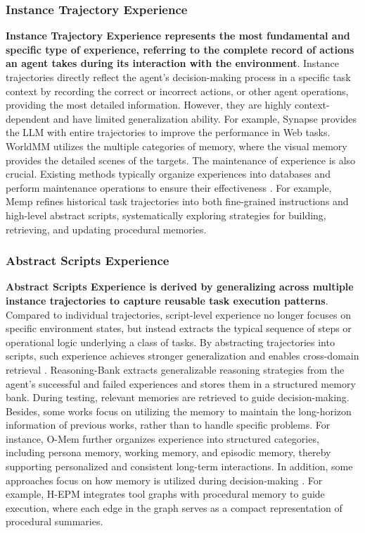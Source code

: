 \subsubsection{Instance Trajectory Experience}
\label{sec:instance_trajectory_experience}
\textbf{Instance Trajectory Experience represents the most fundamental and specific type of experience, referring to the complete record of actions an agent takes during its interaction with the environment}. Instance trajectories directly reflect the agent's decision-making process in a specific task context by recording the correct or incorrect actions, or other agent operations, providing the most detailed information. However, they are highly context-dependent and have limited generalization ability. 
For example, Synapse \cite{Synapse} provides the LLM with entire trajectories to improve the performance in Web tasks. WorldMM \cite{WorldMM} utilizes the multiple categories of memory, where the visual memory provides the detailed scenes of the targets. The maintenance of experience is also crucial. Existing methods typically organize experiences into databases and perform maintenance operations to ensure their effectiveness \cite{Memp, CoPS}. For example, Memp \cite{Memp} refines historical task trajectories into both fine-grained instructions and high-level abstract scripts, systematically exploring strategies for building, retrieving, and updating procedural memories. 



\subsubsection{Abstract Scripts Experience}
\label{sec:abstract_scripts_experience}
\textbf{Abstract Scripts Experience is derived by generalizing across multiple instance trajectories to capture reusable task execution patterns}. Compared to individual trajectories, script-level experience no longer focuses on specific environment states, but instead extracts the typical sequence of steps or operational logic underlying a class of tasks. By abstracting trajectories into scripts, such experience achieves stronger generalization and enables cross-domain retrieval \cite{AGENTKB_2, BIFROST, AWM}. Reasoning-Bank \cite{Reasoning-Bank} extracts generalizable reasoning strategies from the agent’s successful and failed experiences and stores them in a structured memory bank. During testing, relevant memories are retrieved to guide decision-making. Besides, some works \cite{MemGPT, O-Mem} focus on utilizing the memory to maintain the long-horizon information of previous works, rather than to handle specific problems. For instance, O-Mem \cite{O-Mem} further organizes experience into structured categories, including persona memory, working memory, and episodic memory, thereby supporting personalized and consistent long-term interactions. 
In addition, some approaches focus on how memory is utilized during decision-making \cite{Voyager, H-EPM}. For example, H-EPM \cite{H-EPM} integrates tool graphs with procedural memory to guide execution, where each edge in the graph serves as a compact representation of procedural summaries. 


